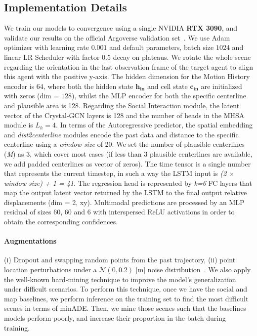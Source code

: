 

\subsection{Implementation Details}

We train our models to convergence using a single NVIDIA \textbf{RTX 3090}, and validate our results on the official Argoverse validation set~\cite{chang2019argoverse}. We use Adam optimizer with learning rate $0.001$ and default parameters, batch size $1024$ and linear LR Scheduler with factor $0.5$ decay on plateaus. We rotate the whole scene regarding the orientation in the last observation frame of the target agent to align this agent with the positive y-axis. The hidden dimension for the Motion History encoder is 64, where both the hidden state $\mathbf{h_{in}}$ and cell state $\mathbf{c_{in}}$ are initialized with zeros (dim = $128$), whilst the MLP encoder for both the specific centerline and plausible area is 128. Regarding the Social Interaction module, the latent vector of the Crystal-GCN layers is 128 and the number of heads in the MHSA module is $L_h = 4$. In terms of the Autoregressive predictor, the spatial embedding and \textit{dist2centerline} modules encode the past data and distance to the specific centerline using a \textit{window size} of 20. We set the number of plausible centerlines (\textit{M}) as 3, which cover most cases (if less than 3 plausible centerlines are available, we add padded centerlines as vector of zeros). The time tensor is a single number that represents the current timestep, in such a way the LSTM input is \textit{(2 $\times$ window size) + 1 = 41}. The regression head is represented by \textit{k=6} FC layers that map the output latent vector returned by the LSTM to the final output relative displacements (dim = 2, xy). Multimodal predictions are processed by an MLP residual of sizes 60, 60 and 6 with interspersed ReLU activations in order to obtain the corresponding confidences.

\paragraph{Augmentations} 

(i) Dropout and swapping random points from the past trajectory, (ii) point location perturbations under a $\mathcal{N}(0, 0.2)$ [m] noise distribution~\cite{ye2021tpcn}. We also apply the well-known hard-mining technique to improve the model's generalization under difficult scenarios. To perform this technique, once we have the social and map baselines, we perform inference on the training set to find the most difficult scenes in terms of minADE. Then, we mine those scenes such that the baselines models perform poorly, and increase their proportion in the batch during training.

